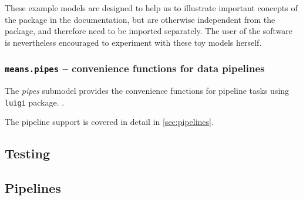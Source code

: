 These example models are designed to help us to illustrate important concepts of the package in the documentation, but are otherwise independent from the package, and therefore need to be imported separately. The user of the software is nevertheless encouraged to experiment with these toy models herself.

\subsubsection{{\tt means.pipes} -- convenience functions for data pipelines}
The \emph{pipes} submodel provides the convenience functions for pipeline tasks using \verb"luigi" package. .

The pipeline support is covered in detail in \autoref{sec:pipelines}.

\subsection{Testing}
\label{sec:testing}
\subsection{Pipelines}
\label{sec:pipelines}

